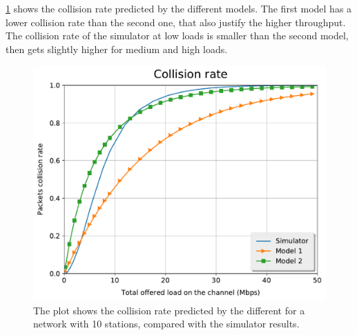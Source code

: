 \cref{fig:cr_10} shows the collision rate predicted by the different models.
The first model has a lower collision rate than the second one, that also justify the higher throughput.
The collision rate of the simulator at low loads is smaller than the second model, then gets slightly higher for medium and high loads.

\begin{figure}[t]
	\centering
	\includegraphics[width=.99\columnwidth]{figures/cr_10}
	\caption{The plot shows the collision rate predicted by the different for a network with 10 stations, compared with the simulator results.}
	\label{fig:cr_10}
\end{figure}

